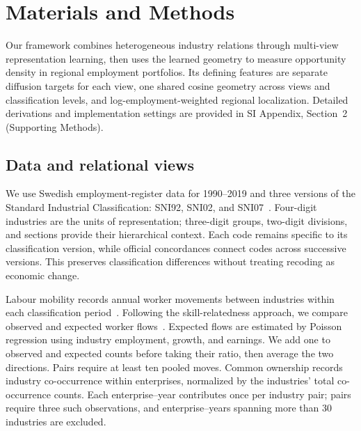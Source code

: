 \documentclass[9pt,twocolumn,twoside]{pnas-new}
\begin{document}
\section{Materials and Methods}
\label{sec:methods}

Our framework combines heterogeneous industry relations through multi-view representation learning, then uses the learned geometry to measure opportunity density in regional employment portfolios. Its defining features are separate diffusion targets for each view, one shared cosine geometry across views and classification levels, and log-employment-weighted regional localization. Detailed derivations and implementation settings are provided in SI Appendix, Section~2 (Supporting Methods).

\subsection{Data and relational views}
\label{subsec:source-specific-relations}

We use Swedish employment-register data for 1990--2019 and three versions of the Standard Industrial Classification: SNI92, SNI02, and SNI07~\cite{statisticsswedenscbMIS200722007,europeancommissionNACERev22008}. Four-digit industries are the units of representation; three-digit groups, two-digit divisions, and sections provide their hierarchical context. Each code remains specific to its classification version, while official concordances connect codes across successive versions. This preserves classification differences without treating recoding as economic change.

Labour mobility records annual worker movements between industries within each classification period~\cite{peterfrykblomMetodOchData2021,mondaniEvolvingNetworkLabor2017}. Following the skill-relatedness approach, we compare observed and expected worker flows~\cite{neffkeSkillRelatednessFirm2013}. Expected flows are estimated by Poisson regression using industry employment, growth, and earnings. We add one to observed and expected counts before taking their ratio, then average the two directions. Pairs require at least ten pooled moves. Common ownership records industry co-occurrence within enterprises, normalized by the industries' total co-occurrence counts. Each enterprise--year contributes once per industry pair; pairs require three such observations, and enterprise--years spanning more than 30 industries are excluded.
\end{document}
